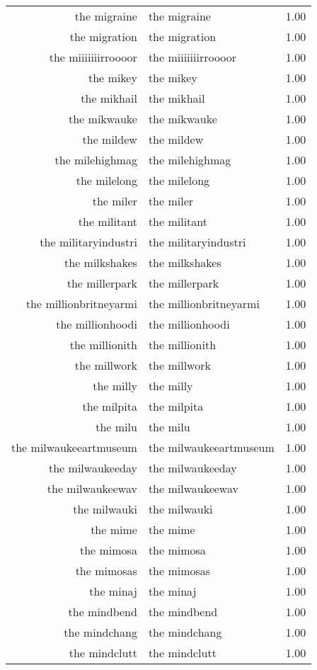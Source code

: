 \begin{table}[ht]
\begin{tabular}{rlr}
  the migraine & the migraine & 1.00 \\ 
  the migration & the migration & 1.00 \\ 
  the miiiiiiirroooor & the miiiiiiirroooor & 1.00 \\ 
  the mikey & the mikey & 1.00 \\ 
  the mikhail & the mikhail & 1.00 \\ 
  the mikwauke & the mikwauke & 1.00 \\ 
  the mildew & the mildew & 1.00 \\ 
  the milehighmag & the milehighmag & 1.00 \\ 
  the milelong & the milelong & 1.00 \\ 
  the miler & the miler & 1.00 \\ 
  the militant & the militant & 1.00 \\ 
  the militaryindustri & the militaryindustri & 1.00 \\ 
  the milkshakes & the milkshakes & 1.00 \\ 
  the millerpark & the millerpark & 1.00 \\ 
  the millionbritneyarmi & the millionbritneyarmi & 1.00 \\ 
  the millionhoodi & the millionhoodi & 1.00 \\ 
  the millionith & the millionith & 1.00 \\ 
  the millwork & the millwork & 1.00 \\ 
  the milly & the milly & 1.00 \\ 
  the milpita & the milpita & 1.00 \\ 
  the milu & the milu & 1.00 \\ 
  the milwaukeeartmuseum & the milwaukeeartmuseum & 1.00 \\ 
  the milwaukeeday & the milwaukeeday & 1.00 \\ 
  the milwaukeewav & the milwaukeewav & 1.00 \\ 
  the milwauki & the milwauki & 1.00 \\ 
  the mime & the mime & 1.00 \\ 
  the mimosa & the mimosa & 1.00 \\ 
  the mimosas & the mimosas & 1.00 \\ 
  the minaj & the minaj & 1.00 \\ 
  the mindbend & the mindbend & 1.00 \\ 
  the mindchang & the mindchang & 1.00 \\ 
  the mindclutt & the mindclutt & 1.00 \\ 

\end{tabular}
\end{table}

